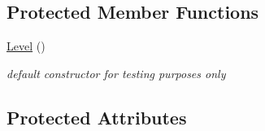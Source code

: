 \subsection*{Protected Member Functions}
\begin{DoxyCompactItemize}
\item 
\hypertarget{class_level_a7a696c928ca5d5354db6e50e46d0f67d}{}\label{class_level_a7a696c928ca5d5354db6e50e46d0f67d} 
\hyperlink{class_level_a7a696c928ca5d5354db6e50e46d0f67d}{Level} ()
\begin{DoxyCompactList}\small\item\em default constructor for testing purposes only \end{DoxyCompactList}\end{DoxyCompactItemize}
\subsection*{Protected Attributes}

